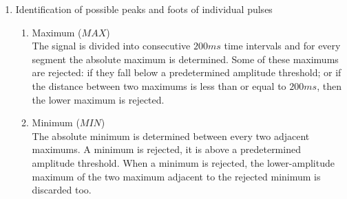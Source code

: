 \begin{enumerate}
  \item Identification of possible peaks and foots of individual pulses
  \begin{enumerate}
    \item Maximum ($MAX$)\\
          The signal is divided into consecutive $200 ms$ time intervals and
          for every segment the absolute maximum is determined. Some of these
          maximums are rejected: if they fall below a predetermined amplitude
          threshold; or if the distance between two maximums is less than or
          equal to $200 ms$, then the lower maximum is rejected.
    \item Minimum ($MIN$)\\
          The absolute minimum is determined between every two adjacent
          maximums. A minimum is rejected, it is above a predetermined
          amplitude threshold. When a minimum is rejected, the lower-amplitude
          maximum of the two maximum adjacent to the rejected minimum is
          discarded too.
  \end{enumerate}


\end{enumerate}
